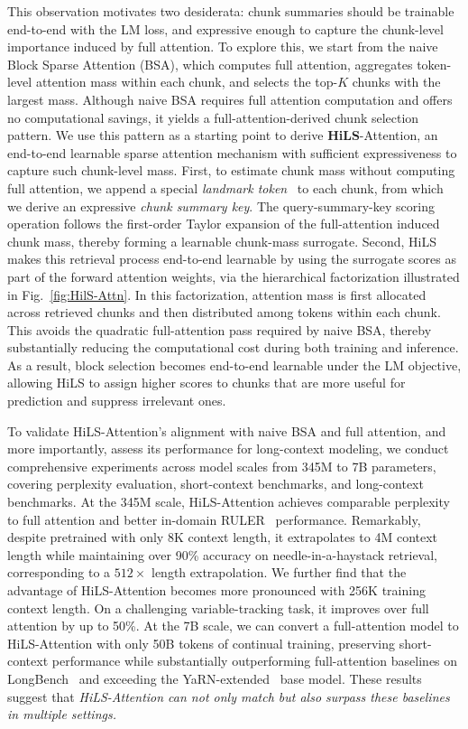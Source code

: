 This observation motivates two desiderata: chunk summaries should be trainable end-to-end with the LM loss, and expressive enough to capture the chunk-level importance induced by full attention.
To explore this, we start from the naive Block Sparse Attention (BSA), which computes full attention, aggregates token-level attention mass within each chunk, and selects the top-$K$ chunks with the largest mass. 
Although naive BSA requires full attention computation and offers no computational savings, it yields a full-attention-derived chunk selection pattern. We use this pattern as a starting point to derive \textbf{HiLS}-Attention, an end-to-end learnable sparse attention mechanism with sufficient expressiveness to capture such chunk-level mass.
First, to estimate chunk mass without computing full attention, we append a special \textit{landmark token}~\cite{mohtashami2023random} to each chunk, from which we derive an expressive \textit{chunk summary key}. The query-summary-key scoring operation follows the first-order Taylor expansion of the full-attention induced chunk mass, thereby forming a learnable chunk-mass surrogate.
Second, HiLS makes this retrieval process end-to-end learnable by using the surrogate scores as part of the forward attention weights, via the hierarchical factorization illustrated in Fig.~\ref{fig:HilS-Attn}.
In this factorization, attention mass is first allocated across retrieved chunks and then distributed among tokens within each chunk. This avoids the quadratic full-attention pass required by naive BSA, thereby substantially reducing the computational cost during both training and inference. As a result, block selection becomes end-to-end learnable under the LM objective, allowing HiLS to assign higher scores to chunks that are more useful for prediction and suppress irrelevant ones.


To validate HiLS-Attention's alignment with naive BSA and full attention, and more importantly, assess its performance for long-context modeling, we conduct comprehensive experiments across model scales from 345M to 7B parameters, covering perplexity evaluation, short-context benchmarks, and long-context benchmarks. 
At the 345M scale, HiLS-Attention achieves comparable perplexity to full attention and better in-domain RULER~\cite{hsieh2024ruler} performance. Remarkably, despite   pretrained with only  8K context length, it extrapolates to 4M context length while maintaining over 90\% accuracy on needle-in-a-haystack retrieval, corresponding to a $512\times$ length extrapolation.
We further find that the advantage of HiLS-Attention becomes more pronounced with  256K training context length. On a challenging variable-tracking task, it improves over full attention by up to 50\%. At the 7B scale, we can convert a full-attention model to HiLS-Attention with only 50B tokens of continual training, preserving short-context performance while substantially outperforming full-attention baselines on LongBench~\cite{bai2024longbench} and exceeding the YaRN-extended~\cite{peng2024yarn} base model.
These results suggest that \textit{HiLS-Attention can not only match but also surpass these baselines in multiple settings.} 

